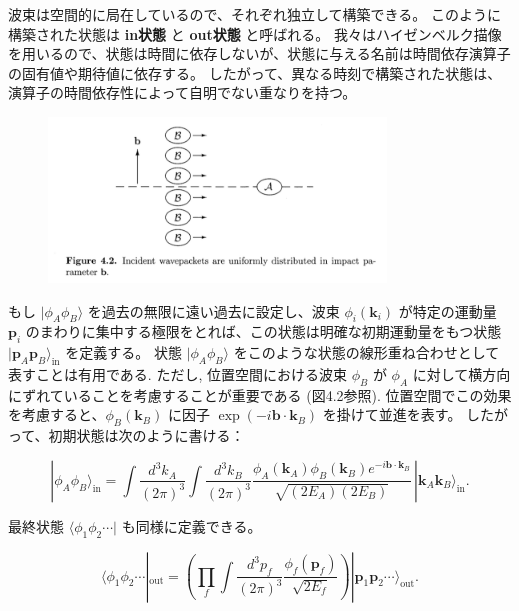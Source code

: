 \documentclass[a4paper,12pt]{article}
\begin{document}
波束は空間的に局在しているので、それぞれ独立して構築できる。  
このように構築された状態は \textbf{in状態} と \textbf{out状態} と呼ばれる。  
我々はハイゼンベルク描像を用いるので、状態は時間に依存しないが、状態に与える名前は時間依存演算子の固有値や期待値に依存する。  
したがって、異なる時刻で構築された状態は、演算子の時間依存性によって自明でない重なりを持つ。  

\begin{figure}[H]
    \centering\includegraphics[width=0.8\textwidth]{figures/fig4.2.png}
\end{figure}

もし $|\phi_A \phi_B\rangle$ を過去の無限に遠い過去に設定し、波束 $\phi_i(\mathbf{k}_i)$ が特定の運動量 $\mathbf{p}_i$ のまわりに集中する極限をとれば、この状態は明確な初期運動量をもつ状態 $| \mathbf{p}_A \mathbf{p}_B\rangle_{\text{in}}$ を定義する。  
状態 $|\phi_A \phi_B\rangle$ をこのような状態の線形重ね合わせとして表すことは有用である. ただし, 位置空間における波束 $\phi_B$ が $\phi_A$ に対して横方向にずれていることを考慮することが重要である (図4.2参照).
位置空間でこの効果を考慮すると、$\phi_B(\mathbf{k}_B)$ に因子 $\exp(-i\mathbf{b}\cdot \mathbf{k}_B)$ を掛けて並進を表す。  
したがって、初期状態は次のように書ける：

\begin{equation}
|\phi_A \phi_B\rangle_{\text{in}}
= \int \frac{d^3k_A}{(2\pi)^3} \int \frac{d^3k_B}{(2\pi)^3} 
\frac{\phi_A(\mathbf{k}_A)\phi_B(\mathbf{k}_B)e^{-i\mathbf{b}\cdot \mathbf{k}_B}}
{\sqrt{(2E_A)(2E_B)}} \, |\mathbf{k}_A \mathbf{k}_B\rangle_{\text{in}} .
\tag{4.68}
\end{equation}

最終状態 $\langle \phi_1\phi_2\cdots|$ も同様に定義できる。  

\begin{equation}
\langle \phi_1\phi_2\cdots|_{\text{out}}
= \left( \prod_f \int \frac{d^3p_f}{(2\pi)^3}\frac{\phi_f(\mathbf{p}_f)}{\sqrt{2E_f}} \right) |\mathbf{p}_1 \mathbf{p}_2 \cdots \rangle_{\text{out}} .
\tag{4.69}
\end{equation}
\end{document}
